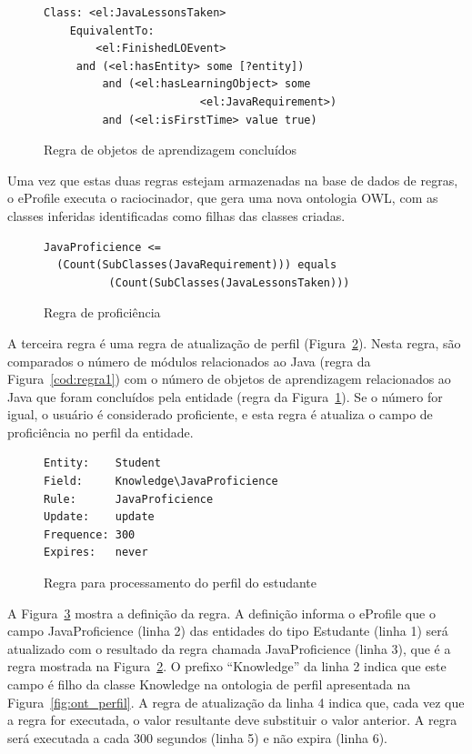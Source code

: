\begin{figure}
\begin{lstlisting}
Class: <el:JavaLessonsTaken>
    EquivalentTo: 
        <el:FinishedLOEvent>
	 and (<el:hasEntity> some [?entity])
         and (<el:hasLearningObject> some 
	                    <el:JavaRequirement>)
         and (<el:isFirstTime> value true)
\end{lstlisting}
\caption{Regra de objetos de aprendizagem concluídos}
\label{cod:regra2}
\end{figure}

Uma vez que estas duas regras estejam armazenadas na base de dados de regras, o eProfile executa o raciocinador, que gera uma nova ontologia OWL, com as classes inferidas identificadas como filhas das classes criadas.

\begin{figure}
\begin{lstlisting}
JavaProficience <= 
  (Count(SubClasses(JavaRequirement))) equals
          (Count(SubClasses(JavaLessonsTaken)))
\end{lstlisting}
\caption{Regra de proficiência}
\label{cod:regra3}
\end{figure}

A terceira regra é uma regra de atualização de perfil (Figura~\ref{cod:regra3}). Nesta regra, são comparados o número de módulos relacionados ao Java (regra da Figura~\ref{cod:regra1}) com o número de objetos de aprendizagem relacionados ao Java que foram concluídos pela entidade (regra da Figura~\ref{cod:regra2}). Se o número for igual, o usuário é considerado proficiente, e esta regra é atualiza o campo de proficiência no perfil da entidade.

\begin{figure}[!t]
\begin{lstlisting}
Entity:    Student
Field:     Knowledge\JavaProficience
Rule:      JavaProficience
Update:    update
Frequence: 300
Expires:   never
\end{lstlisting}
\caption{Regra para processamento do perfil do estudante}
\label{fig:defregra}
\end{figure}

A Figura~\ref{fig:defregra} mostra a definição da regra. A definição informa o eProfile que o campo JavaProficience (linha 2) das entidades do tipo Estudante (linha 1) será atualizado com o resultado da regra chamada JavaProficience (linha 3), que é a regra mostrada na Figura~\ref{cod:regra3}. O prefixo ``Knowledge'' da linha 2 indica que este campo é filho da classe Knowledge na ontologia de perfil apresentada na Figura~\ref{fig:ont_perfil}. A regra de atualização da linha 4 indica que, cada vez que a regra for executada, o valor resultante deve substituir o valor anterior. A regra será executada a cada 300 segundos (linha 5) e não expira (linha 6).

